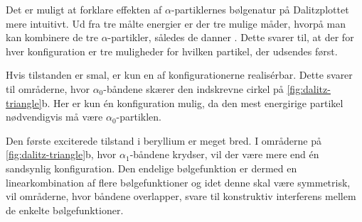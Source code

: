 Det er muligt at forklare effekten af $\alpha$-partiklernes bølgenatur på Dalitzplottet mere
intuitivt. Ud fra tre målte energier er der tre mulige måder, hvorpå man kan kombinere de tre
$\alpha$-partikler, således de danner \Be*. Dette svarer til, at der for hver konfiguration er tre
muligheder for hvilken partikel, der udsendes først.

Hvis \Be* tilstanden er smal, er kun en af konfigurationerne realisérbar. Dette svarer til
områderne, hvor $\alpha_{0}$-båndene skærer den indskrevne cirkel på \cref{fig:dalitz-triangle}b. Her er
kun én konfiguration mulig, da den mest energirige partikel nødvendigvis må være
$\alpha_{0}$-partiklen.


Den første exciterede tilstand i beryllium er meget bred. I områderne på
\cref{fig:dalitz-triangle}b, hvor $\alpha_{1}$-båndene krydser, vil der være mere end én sandsynlig
konfiguration.  Den endelige bølgefunktion er dermed en linearkombination af flere bølgefunktioner
og idet denne skal være symmetrisk, vil områderne, hvor båndene overlapper, svare til konstruktiv
interferens mellem de enkelte bølgefunktioner. 














